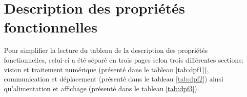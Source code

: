 

\chapter{Description des propriétés fonctionnelles}
\label{s:fonctionnelles}
Pour simplifier la lecture du tableau de la description des propriétés fonctionnelles, celui-ci a été séparé en trois pages selon trois différentes sections: vision et traitement numérique (présenté dans le tableau \ref{tab:dpf1}), communication et déplacement (présenté dans le tableau \ref{tab:dpf2}) ainsi qu'alimentation et affichage (présenté dans le tableau \ref{tab:dpf3}). 

\newlength{\hcolw}
\setlength{\hcolw}{\textwidth}
\eject \pdfpagewidth=15.7in \pdfpageheight=10in
\textwidth=13.7in

